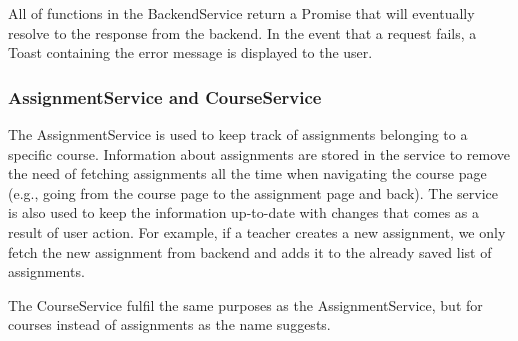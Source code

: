 All of functions in the BackendService return a Promise that will eventually resolve to the response from the backend. In the event that a request fails, a Toast containing the error message is displayed to the user. 

\subsubsection{AssignmentService and CourseService}
The AssignmentService is used to keep track of assignments belonging to a specific course. Information about assignments are stored in the service to remove the need of fetching assignments all the time when navigating the course page (e.g., going from the course page to the assignment page and back). The service is also used to keep the information up-to-date with changes that comes as a result of user action. For example, if a teacher creates a new assignment, we only fetch the new assignment from backend and adds it to the already saved list of assignments.

The CourseService fulfil the same purposes as the AssignmentService, but for courses instead of assignments as the name suggests.
